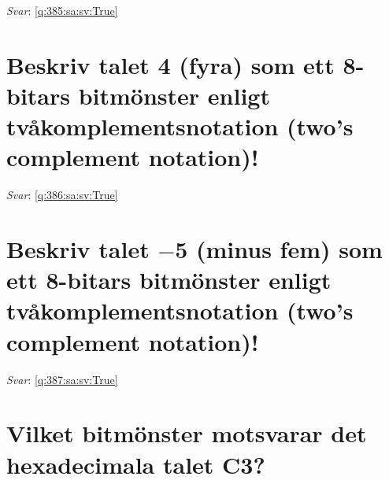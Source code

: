 \documentclass[a4paper,11pt,oneside]{book}
\begin{document}
\begin{sloppypar}
\label{q:385:sa:sv:False}

\vspace{2cm}

\noindent\makebox[\textwidth]{\hrulefill}

\vspace{1cm}

\textit{Svar}: \autoref{q:385:sa:sv:True}



\section{Beskriv talet 4 (fyra) som ett 8-bitars bitm\"onster enligt tv\r{a}komplementsnotation (two{\textquoteright}s complement notation)!}

\label{q:386:sa:sv:False}

\vspace{2cm}

\noindent\makebox[\textwidth]{\hrulefill}

\vspace{1cm}

\textit{Svar}: \autoref{q:386:sa:sv:True}



\section{Beskriv talet \ensuremath{-}5 (minus fem) som ett 8-bitars bitm\"onster enligt tv\r{a}komplementsnotation (two{\textquoteright}s complement notation)!}

\label{q:387:sa:sv:False}

\vspace{2cm}

\noindent\makebox[\textwidth]{\hrulefill}

\vspace{1cm}

\textit{Svar}: \autoref{q:387:sa:sv:True}



\section{Vilket bitm\"onster motsvarar det hexadecimala talet C3?}

\label{q:388:sa:sv:False}

\vspace{2cm}

\noindent\makebox[\textwidth]{\hrulefill}


\end{sloppypar}
\end{document}
